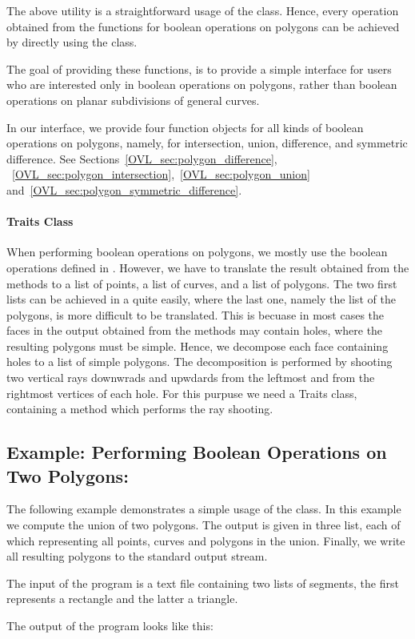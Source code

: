 The above utility is a straightforward usage of the 
class. Hence, every operation obtained from the functions 
for boolean operations on polygons can be achieved by 
directly using the  
class. 

The goal of providing these functions, is to 
provide a simple interface for users who are 
interested only in boolean operations on 
polygons, rather than boolean operations 
on planar subdivisions of general curves.

In our interface, we provide four function objects 
for all kinds of boolean operations on polygons,
namely, for intersection, union, difference, and 
symmetric difference.
See Sections~\ref{OVL_sec:polygon_difference},
~\ref{OVL_sec:polygon_intersection},~\ref{OVL_sec:polygon_union} 
and~\ref{OVL_sec:polygon_symmetric_difference}. 

\paragraph{Traits Class}
When performing boolean operations on polygons, 
we mostly use the boolean operations defined in 
.
However, we have to translate the result obtained from the 
 methods to a list 
of points, a list of curves, and a list of polygons.
The two first lists can be achieved in a quite easily,
where the last one, namely the list of the polygons,
is more difficult to be translated. This is becuase 
in most cases the faces in the output obtained from the 
 methods may contain holes,
where the resulting polygons must be simple.
Hence, we decompose each face containing holes to a list 
of simple polygons. The decomposition is performed by shooting 
two vertical rays downwrads and upwdards from the leftmost 
and from the rightmost vertices of each hole. 
For this purpuse we need a Traits class, containing a method 
which performs the ray shooting. 

\subsection*{Example: Performing Boolean Operations on Two Polygons:}
The following example demonstrates a simple usage of the 
 class.
In this example we compute the union of two polygons.
The output is given in three list, each of which
representing all points, curves and polygons in the union.
Finally, we write all resulting polygons to the standard output stream. 


The input of the program is a text file containing two lists of segments, 
the first represents a rectangle and the latter a triangle.

The output of the program looks like this:





